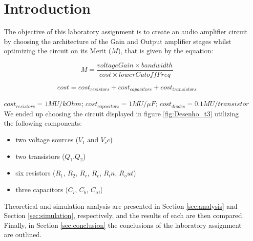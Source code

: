 
\section{Introduction}
\label{sec:introduction}



The objective of this laboratory assignment is to create an audio amplifier circuit by choosing the architecture of the Gain and Output amplifier stages whilst optimizing the circuit on its Merit ($M$), that is given by the equation:

\[
M = \frac{voltageGain\times bandwidth}{cost\times lowerCutoffFreq}
\]

\[
 cost = cost_{resistors} + cost_{capacitors} + cost_{transistors} 
\]

$cost_{resistors} = 1MU/kOhm$; $cost_{capacitors} = 1MU/\mu F$;
$cost_{diodes} = 0.1MU/transistor$ \\

We ended up choosing the circuit displayed in figure \ref{fig:Desenho_t3} utilizing the following components:

\begin{itemize}
	\item two voltage sources ($V_1$ and $V_cc$)
	\item two transistors ($Q_1$,$Q_2$)
	\item six resistors ($R_1$, $R_2$, $R_e$, $R_c$, $R_in$, $R_out$)
	\item three capacitors ($C_i$, $C_b$, $C_o$,)
\end{itemize}


Theoretical and simulation analysis are presented in Section \ref{sec:analysis} and Section \ref{sec:simulation}, respectively, and the results of each are then compared.
Finally, in Section \ref{sec:conclusion} the conclusions of the laboratory assignment are outlined. 





